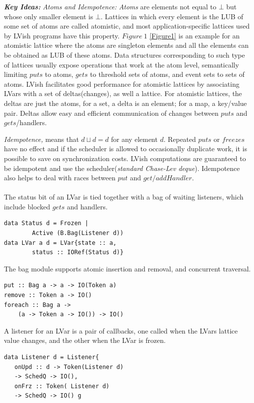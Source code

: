 \documentclass[twocolumn]{article}
\begin{document}
\textbf{\textit{Key Ideas:}} \textit{Atoms and Idempotence:} \textit{Atoms} are elements not equal to $\bot$ but whose only smaller element is $\bot$. Lattices in which every element is the LUB of some set of atoms are called atomistic, and most application-specific lattices used by LVish programs have this property. $Figure\ 1$ \ref{Figure1} is an example for an atomistic lattice where the atoms are singleton elements and all the elements can be obtained as LUB of these atoms. Data structures corresponding to such type of lattices usually expose operations that work at the atom level, semantically limiting $puts$ to atoms, $gets$ to threshold sets of atoms, and event sets to sets of atoms. LVish facilitates good performance for atomistic lattices by associating LVars with a set of deltas(changes), as well a lattice. For atomistic lattices, the deltas are just the atoms, for a set, a delta is an element; for a map, a key/value pair. Deltas allow easy and efficient communication of changes between $puts$ and $gets$/handlers. \par
\textit{Idempotence,} means that $d\sqcup{d=d}$ for any element $d$. Repeated $puts$ or $freezes$ have no effect and if the scheduler is allowed to occasionally duplicate work, it is possible to save on synchronization costs. LVish computations are guaranteed to be idempotent and use the scheduler(\textit{standard Chase-Lev deque}). Idempotence also 	helps to deal with races between $put$ and $get/addHandler$. \\ \\ 
The status bit of an LVar is tied together with a bag of waiting listeners, which include blocked $gets$ and handlers.
\begin{verbatim}
data Status d = Frozen |
	    Active (B.Bag(Listener d))
data LVar a d = LVar{state :: a,
	    status :: IORef(Status d)} 
\end{verbatim}
The bag module supports atomic insertion and removal, and concurrent traversal.
\begin{verbatim}
put :: Bag a -> a -> IO(Token a)
remove :: Token a -> IO() 
foreach :: Bag a ->
    (a -> Token a -> IO()) -> IO()
\end{verbatim}
A listener for an LVar is a pair of callbacks, one called when the LVars lattice value changes, and the other when the LVar is frozen. 
\begin{verbatim}
data Listener d = Listener{
   onUpd :: d -> Token(Listener d)
   -> SchedQ -> IO(),
   onFrz :: Token( Listener d)
   -> SchedQ -> IO() g
\end{verbatim}
\end{document}
